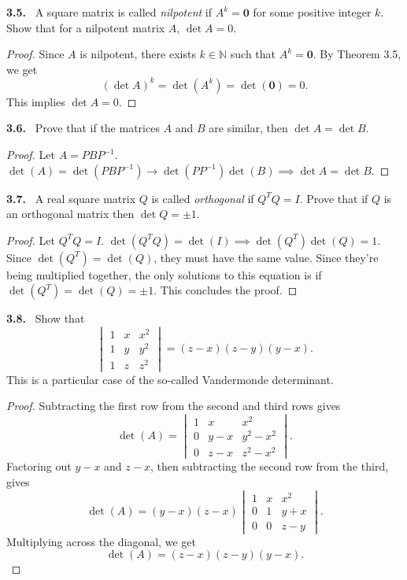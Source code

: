 \documentclass[12pt]{amsart}
\newcommand{\N}{\mathbb{N}}
\theoremstyle{plain}
\theoremstyle{definition}
\theoremstyle{remark}
\newenvironment{problem}[1]{\par\medskip\noindent\textbf{#1.}\ }{\par\smallskip}
\begin{document}
\begin{problem}{3.5}
A square matrix is called \emph{nilpotent} if $A^k = \bm{0}$ for some positive integer $k$. Show that for a nilpotent matrix $A$, $\det A = 0$.
\end{problem}

\begin{proof}
Since $A$ is nilpotent, there exists $k \in \N$ such that $A^k = \bm{0}$.
By Theorem 3.5, we get
\[
  (\det A)^k = \det(A^k) = \det(\bm{0}) = 0.
\]
This implies $\det A = 0$.
\end{proof}

\begin{problem}{3.6}
Prove that if the matrices $A$ and $B$ are similar, then $\det A = \det B$.
\end{problem}

\begin{proof}
  Let $A = PBP^{-1}$. $\det(A) = \det(PBP^{-1}) \to \det(PP^{-1})\det(B) \implies \det A = \det B$. 
\end{proof}

\begin{problem}{3.7}
A real square matrix $Q$ is called \emph{orthogonal} if $Q^T Q = I$. Prove that if $Q$ is an orthogonal matrix then $\det Q = \pm 1$.
\end{problem}

\begin{proof}
  Let $Q^TQ = I$. $\det(Q^TQ)=\det(I) \implies \det(Q^T)\det(Q)=1$. Since $\det(Q^T) = \det(Q)$, they must have the same value. Since they're being multiplied together, the only solutions to this equation is if $\det(Q^T)=\det(Q)=\pm 1$. This concludes the proof. 
\end{proof}

\begin{problem}{3.8}
Show that
\[
  \begin{vmatrix} 1 & x & x^2 \\ 1 & y & y^2 \\ 1 & z & z^2 \end{vmatrix}
  = (z - x)(z - y)(y - x).
\]
This is a particular case of the so-called Vandermonde determinant.
\end{problem}

\begin{proof}
Subtracting the first row from the second and third rows gives
\[
\det(A)=
\begin{vmatrix}
1&x&x^2\\
0&y-x&y^2-x^2\\
0&z-x&z^2-x^2
\end{vmatrix}.
\]
Factoring out $y-x$ and $z-x$, then subtracting the second row from the third, gives
\[
\det(A)=(y-x)(z-x)
\begin{vmatrix}
1&x&x^2\\
0&1&y+x\\
0&0&z-y
\end{vmatrix}.
\]
Multiplying across the diagonal, we get
\[
\det(A)=(z-x)(z-y)(y-x).
\]
\end{proof}
\end{document}
